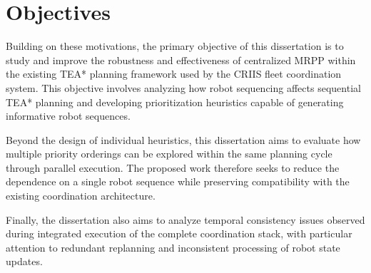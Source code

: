 \section{Objectives}
\hspace{\parindent}
Building on these motivations, the primary objective of this dissertation is to study and improve the
robustness and effectiveness of centralized MRPP within the existing TEA* planning framework used
by the CRIIS fleet coordination system. This objective involves analyzing
how robot sequencing affects sequential TEA* planning and developing prioritization
heuristics capable of generating informative robot sequences.

Beyond the design of individual heuristics, this dissertation aims to evaluate how multiple priority
orderings can be explored within the same planning cycle through parallel execution. The proposed
work therefore seeks to reduce the dependence on a single robot sequence while preserving
compatibility with the existing coordination architecture.

Finally, the dissertation also aims to analyze temporal consistency issues observed during integrated
execution of the complete coordination stack, with particular attention to redundant replanning and
inconsistent processing of robot state updates. 